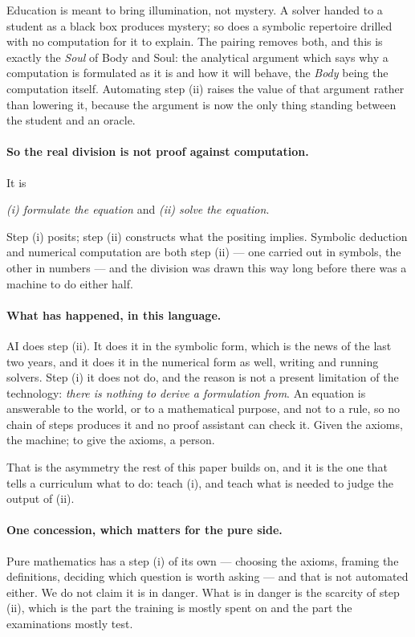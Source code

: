 \documentclass[11pt]{article}
\begin{document}
Education is meant to bring illumination, not mystery. A solver handed to a student as a black box
produces mystery; so does a symbolic repertoire drilled with no computation for it to explain. The
pairing removes both, and this is exactly the \emph{Soul} of Body and Soul: the analytical argument
which says why a computation is formulated as it is and how it will behave, the \emph{Body} being
the computation itself. Automating step (ii) raises the value of that argument rather than lowering
it, because the argument is now the only thing standing between the student and an oracle.

\paragraph{So the real division is not proof against computation.} It is
\begin{center}
\emph{(i) formulate the equation} \qquad and \qquad \emph{(ii) solve the equation}.
\end{center}
Step (i) posits; step (ii) constructs what the positing implies. Symbolic deduction and numerical
computation are both step (ii) --- one carried out in symbols, the other in numbers --- and the
division was drawn this way long before there was a machine to do either half.

\paragraph{What has happened, in this language.} AI does step (ii). It does it in the symbolic form,
which is the news of the last two years, and it does it in the numerical form as well, writing and
running solvers. Step (i) it does not do, and the reason is not a present limitation of the
technology: \emph{there is nothing to derive a formulation from}. An equation is answerable to the
world, or to a mathematical purpose, and not to a rule, so no chain of steps produces it and no
proof assistant can check it. Given the axioms, the machine; to give the axioms, a person.

That is the asymmetry the rest of this paper builds on, and it is the one that tells a curriculum
what to do: teach (i), and teach what is needed to judge the output of (ii).

\paragraph{One concession, which matters for the pure side.} Pure mathematics has a step (i) of its
own --- choosing the axioms, framing the definitions, deciding which question is worth asking --- and
that is not automated either. We do not claim it is in danger. What is in danger is the scarcity of
step (ii), which is the part the training is mostly spent on and the part the examinations mostly
test.
\end{document}
